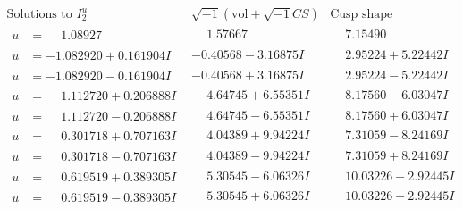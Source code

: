 \documentclass[1p]{elsarticle_modified}
\theoremstyle{definition}
\newcommand{\I}{\sqrt{-1}}
\begin{document}
$$\begin{array}{c|c|c}  
\text{Solutions to }I^u_{2}& \I (\text{vol} + \sqrt{-1}CS) & \text{Cusp shape}\\
 \hline 
\begin{aligned}
u &= \phantom{-}1.08927\phantom{ +0.000000I}\end{aligned}
 & \phantom{-}1.57667\phantom{ +0.000000I} & \phantom{-}7.15490\phantom{ +0.000000I} \\ \hline\begin{aligned}
u &= -1.082920 + 0.161904 I\end{aligned}
 & -0.40568 - 3.16875 I & \phantom{-}2.95224 + 5.22442 I \\ \hline\begin{aligned}
u &= -1.082920 - 0.161904 I\end{aligned}
 & -0.40568 + 3.16875 I & \phantom{-}2.95224 - 5.22442 I \\ \hline\begin{aligned}
u &= \phantom{-}1.112720 + 0.206888 I\end{aligned}
 & \phantom{-}4.64745 + 6.55351 I & \phantom{-}8.17560 - 6.03047 I \\ \hline\begin{aligned}
u &= \phantom{-}1.112720 - 0.206888 I\end{aligned}
 & \phantom{-}4.64745 - 6.55351 I & \phantom{-}8.17560 + 6.03047 I \\ \hline\begin{aligned}
u &= \phantom{-}0.301718 + 0.707163 I\end{aligned}
 & \phantom{-}4.04389 + 9.94224 I & \phantom{-}7.31059 - 8.24169 I \\ \hline\begin{aligned}
u &= \phantom{-}0.301718 - 0.707163 I\end{aligned}
 & \phantom{-}4.04389 - 9.94224 I & \phantom{-}7.31059 + 8.24169 I \\ \hline\begin{aligned}
u &= \phantom{-}0.619519 + 0.389305 I\end{aligned}
 & \phantom{-}5.30545 - 6.06326 I & \phantom{-}10.03226 + 2.92445 I \\ \hline\begin{aligned}
u &= \phantom{-}0.619519 - 0.389305 I\end{aligned}
 & \phantom{-}5.30545 + 6.06326 I & \phantom{-}10.03226 - 2.92445 I \\ \hline\begin{aligned}

\end{aligned}
\end{array}$$
\end{document}
